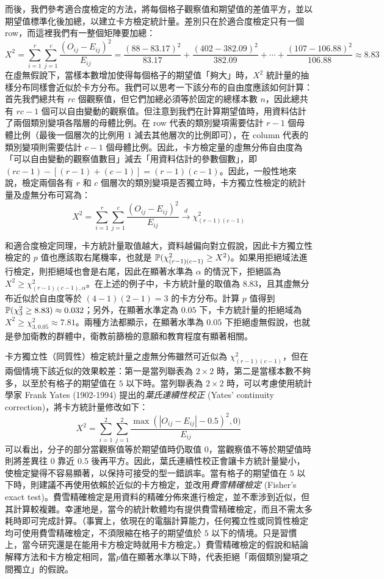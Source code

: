     而後，我們參考適合度檢定的方法，將每個格子觀察值和期望值的差值平方，並以期望值標準化後加總，以建立卡方檢定統計量。差別只在於適合度檢定只有一個 row，而這裡我們有一整個矩陣要加總：
    \[X^2 = \sum_{i=1}^r \sum_{j=1}^c \frac{(O_{ij}-E_{ij})^2}{E_{ij}} = \frac{(88-83.17)^2}{83.17} + \frac{(402-382.09)^2}{382.09} + \cdots + \frac{(107-106.88)^2}{106.88} \approx 8.83\]
    在虛無假說下，當樣本數增加使得每個格子的期望值「夠大」時，$X^2$ 統計量的抽樣分布同樣會近似於卡方分布。我們可以思考一下該分布的自由度應該如何計算：首先我們總共有 $rc$ 個觀察值，但它們加總必須等於固定的總樣本數 $n$，因此總共有 $rc - 1$ 個可以自由變動的觀察值。但注意到我們在計算期望值時，用資料估計了兩個類別變項各階層的母體比例。在 row 代表的類別變項需要估計 $r-1$ 個母體比例（最後一個層次的比例用 $1$ 減去其他層次的比例即可），在 column 代表的類別變項則需要估計 $c-1$ 個母體比例。因此，卡方檢定量的虛無分佈自由度為「可以自由變動的觀察值數目」減去「用資料估計的參數個數」，即$(rc-1) - [(r-1) + (c-1)] = (r-1)(c-1)$。因此，一般性地來說，檢定兩個各有 $r$ 和 $c$ 個層次的類別變項是否獨立時，卡方獨立性檢定的統計量及虛無分布可寫為：
    \[X^2 = \sum_{i=1}^r \sum_{j=1}^c \frac{(O_{ij}-E_{ij})^2}{E_{ij}} \xrightarrow[]{d} \chi^2_{(r-1)(c-1)}\]

    和適合度檢定同理，卡方統計量取值越大，資料越偏向對立假說，因此卡方獨立性檢定的 $p$ 值也應該取右尾機率，也就是 $\mathbb{P}(\chi^2_{(r-1)(c-1)} \ge X^2)$。如果用拒絕域法進行檢定，則拒絕域也會是右尾，因此在顯著水準為 $\alpha$ 的情況下，拒絕區為 $X^2 \ge \chi^2_{(r-1)(c-1), \alpha}$。在上述的例子中，卡方統計量的取值為 $8.83$，且其虛無分布近似於自由度等於 $(4-1)(2-1) = 3$ 的卡方分布。計算 $p$ 值得到 $\mathbb{P}(\chi^2_3 \ge 8.83) \approx 0.032$；另外，在顯著水準定為 $0.05$ 下，卡方統計量的拒絕域為 $X^2 \ge \chi^2_{3,0.05} \approx 7.81$。兩種方法都顯示，在顯著水準為 $0.05$ 下拒絕虛無假說，也就是參加衛教的群體中，衛教前篩檢的意願和教育程度有顯著相關。

    卡方獨立性（同質性）檢定統計量之虛無分佈雖然可近似為 $\chi^2_{(r-1)(c-1)}$，但在兩個情境下該近似的效果較差：第一是當列聯表為 $2 \times 2$ 時，第二是當樣本數不夠多，以至於有格子的期望值在 $5$ 以下時。當列聯表為 $2 \times 2$ 時，可以考慮使用統計學家 Frank Yates (1902-1994) 提出的\textit{葉氏連續性校正} (Yates' continuity correction)，將卡方統計量修改如下：
    \[X^2 = \sum_{i=1}^2 \sum_{j=1}^2 \frac{\max(|O_{ij}-E_{ij}|-0.5)^2,0)}{E_{ij}}\]
    可以看出，分子的部分當觀察值等於期望值時仍取值 $0$，當觀察值不等於期望值時則將差異往 $0$ 靠近 $0.5$ 後再平方。因此，葉氏連續性校正會讓卡方統計量變小，使檢定變得不容易顯著，以保持可接受的型一錯誤率。當有格子的期望值在 $5$ 以下時，則建議不再使用依賴於近似的卡方檢定，並改用\textit{費雪精確檢定} (Fisher's exact test)。費雪精確檢定是用資料的精確分佈來進行檢定，並不牽涉到近似，但其計算較複雜。幸運地是，當今的統計軟體均有提供費雪精確檢定，而且不需太多耗時即可完成計算。（事實上，依現在的電腦計算能力，任何獨立性或同質性檢定均可使用費雪精確檢定，不須限縮在格子的期望值於 $5$ 以下的情境。只是習慣上，當今研究還是在能用卡方檢定時就用卡方檢定。）費雪精確檢定的假說和結論解釋方法和卡方檢定相同，當$p$值在顯著水準以下時，代表拒絕「兩個類別變項之間獨立」的假說。
    
